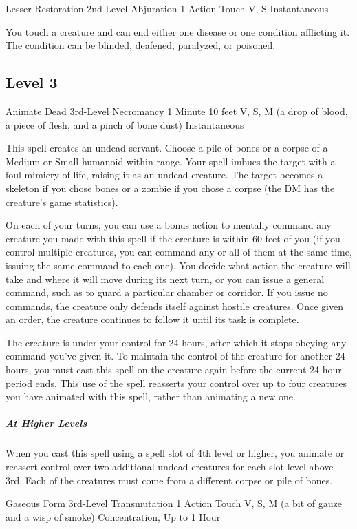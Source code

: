 {\DndSpellHeader
  {Lesser Restoration}
  {2nd-Level Abjuration}
  {1 Action}
  {Touch}
  {V, S}
  {Instantaneous}

You touch a creature and can end either one disease or one condition afflicting it. The condition can be blinded, deafened, paralyzed, or poisoned.

\subsection*{Level 3}

\DndSpellHeader
  {Animate Dead}
  {3rd-Level Necromancy}
  {1 Minute}
  {10 feet}
  {V, S, M (a drop of blood, a piece of flesh, and a pinch of bone dust)}
  {Instantaneous}

This spell creates an undead servant. Choose a pile of bones or a corpse of a Medium or Small humanoid within range. Your spell imbues the target with a foul mimicry of life, raising it as an undead creature. The target becomes a skeleton if you chose bones or a zombie if you chose a corpse (the DM has the creature's game statistics).

On each of your turns, you can use a bonus action to mentally command any creature you made with this spell if the creature is within 60 feet of you (if you control multiple creatures, you can command any or all of them at the same time, issuing the same command to each one). You decide what action the creature will take and where it will move during its next turn, or you can issue a general command, such as to guard a particular chamber or corridor. If you issue no commands, the creature only defends itself against hostile creatures. Once given an order, the creature continues to follow it until its task is complete.

The creature is under your control for 24 hours, after which it stops obeying any command you've given it. To maintain the control of the creature for another 24 hours, you must cast this spell on the creature again before the current 24-hour period ends. This use of the spell reasserts your control over up to four creatures you have animated with this spell, rather than animating a new one.

\subparagraph*{At Higher Levels} When you cast this spell using a spell slot of 4th level or higher, you animate or reassert control over two additional undead creatures for each slot level above 3rd. Each of the creatures must come from a different corpse or pile of bones.

\DndSpellHeader
  {Gaseous Form}
  {3rd-Level Transmutation}
  {1 Action}
  {Touch}
  {V, S, M (a bit of gauze and a wisp of smoke)}
  {Concentration, Up to 1 Hour}

}
